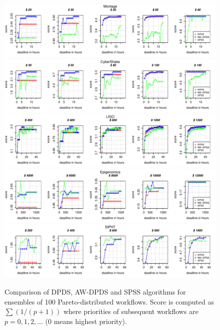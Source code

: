 \documentclass{sig-alternate}
\begin{document}
\begin{figure}[htb] 
\centering
\includegraphics[width=1.0\textwidth]{figures/score-MONTAGE-n-1000-8-dagh1-20m0.pdf}
\includegraphics[width=1.0\textwidth]{figures/score-CYBERSHAKE-n-1000-8-dagh1-20m0.pdf}
\includegraphics[width=1.0\textwidth]{figures/score-LIGO-n-1000-8-dagh1-40m0.pdf}
\includegraphics[width=1.0\textwidth]{figures/score-GENOME-n-1000-8-dagh100-1500m0.pdf}
\includegraphics[width=1.0\textwidth]{figures/score-SIPHT-n-1000-8-dagh5-50m0.pdf}
\caption{Comparison of DPDS, AW-DPDS and SPSS algorithms for ensembles of 100
Pareto-distributed workflows. Score is computed as $\sum(1/(p+1))$ where
priorities of subsequent workflows are $p=0,1,2,\ldots$ (0 means highest
priority).}
\label{fig:}
\end{figure}
\end{document}
